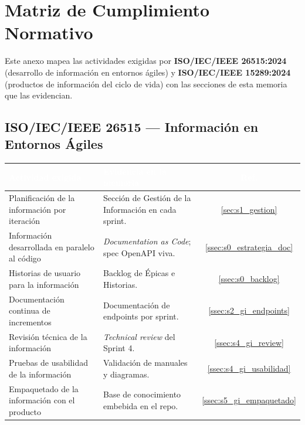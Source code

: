 \chapter{Matriz de Cumplimiento Normativo}
\label{cap:anexo_iso}

Este anexo mapea las actividades exigidas por \textbf{ISO/IEC/IEEE 26515:2024} (desarrollo de
información en entornos ágiles) y \textbf{ISO/IEC/IEEE 15289:2024} (productos de información del
ciclo de vida) con las secciones de esta memoria que las evidencian.\par

\section{ISO/IEC/IEEE 26515 — Información en Entornos Ágiles}
\label{sec:anexo_iso_26515}
\renewcommand{\arraystretch}{1.3}
\fontsize{8.8}{10.5}\selectfont\sffamily
\noindent
\begin{tabularx}{\textwidth}{|X|X|c|}
\hline
\rowcolor{colorPrimario}
\textcolor{white}{\textbf{Actividad exigida}} & \textcolor{white}{\textbf{Evidencia en la memoria}} & \textcolor{white}{\textbf{Ref.}} \\ \hline
Planificación de la información por iteración & Sección de Gestión de la Información en cada sprint. & \ref{sec:s1_gestion} \\ \hline
\rowcolor{grisTecnico}
Información desarrollada en paralelo al código & \textit{Documentation as Code}; spec OpenAPI viva. & \ref{ssec:s0_estrategia_doc} \\ \hline
Historias de usuario para la información & Backlog de Épicas e Historias. & \ref{ssec:s0_backlog} \\ \hline
\rowcolor{grisTecnico}
Documentación continua de incrementos & Documentación de endpoints por sprint. & \ref{ssec:s2_gi_endpoints} \\ \hline
Revisión técnica de la información & \textit{Technical review} del Sprint 4. & \ref{ssec:s4_gi_review} \\ \hline
\rowcolor{grisTecnico}
Pruebas de usabilidad de la información & Validación de manuales y diagramas. & \ref{ssec:s4_gi_usabilidad} \\ \hline
Empaquetado de la información con el producto & Base de conocimiento embebida en el repo. & \ref{ssec:s5_gi_empaquetado} \\ \hline
\end{tabularx}\normalfont\normalsize
\par\vspace{0.3cm}

